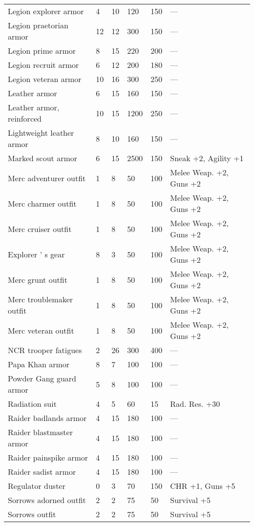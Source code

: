 \documentclass{report}
\begin{document}
\begin{table}[H]
\begin{table}[H]
\begin{table}[H]
\begin{table}[H]
\begin{table}[H]
\begin{table}[H]
\begin{table}[H]
\begin{table}[H]
\begin{table}[H]
\begin{table}[H]
\begin{table}[H]
\begin{table}[H]
\begin{table}[H]
\begin{table}[H]
\begin{table}[H]
\begin{table}[H]
\begin{table}[H]
\begin{table}[H]
\begin{table}[H]
\begin{tabular}{p{30mm}p{30mm}p{30mm}p{30mm}p{30mm}p{30mm}}
Legion explorer armor  & 4 & 10 & 120 & 150 & —  \\
Legion praetorian armor  & 12 & 12 & 300 & 150 & —  \\
Legion prime armor  & 8 & 15 & 220 & 200 & —  \\
Legion recruit armor  & 6 & 12 & 200 & 180 & —  \\
Legion veteran armor  & 10 & 16 & 300 & 250 & —  \\
Leather armor  & 6 & 15 & 160 & 150 & —  \\
Leather armor, reinforced  & 10 & 15 & 1200 & 250 & —  \\
Lightweight leather armor  & 8 & 10 & 160 & 150 & —  \\
Marked scout armor  & 6 & 15 & 2500 & 150 & Sneak +2, Agility +1  \\
Merc adventurer outfit  & 1 & 8 & 50 & 100 & Melee Weap. +2, Guns +2  \\
Merc charmer outfit  & 1 & 8 & 50 & 100 & Melee Weap. +2, Guns +2  \\
Merc cruiser outfit  & 1 & 8 & 50 & 100 & Melee Weap. +2, Guns +2  \\
Explorer ' s gear  & 8 & 3 & 50 & 100 & Melee Weap. +2, Guns +2  \\
Merc grunt outfit  & 1 & 8 & 50 & 100 & Melee Weap. +2, Guns +2  \\
Merc troublemaker outfit  & 1 & 8 & 50 & 100 & Melee Weap. +2, Guns +2  \\
Merc veteran outfit  & 1 & 8 & 50 & 100 & Melee Weap. +2, Guns +2  \\
NCR trooper fatigues  & 2 & 26 & 300 & 400 & —  \\
Papa Khan armor  & 8 & 7 & 100 & 100 & —  \\
Powder Gang guard armor  & 5 & 8 & 100 & 100 & —  \\
Radiation suit  & 4 & 5 & 60 & 15 & Rad. Res. +30  \\
Raider badlands armor  & 4 & 15 & 180 & 100 & —  \\
Raider blastmaster armor  & 4 & 15 & 180 & 100 & —  \\
Raider painspike armor  & 4 & 15 & 180 & 100 & —  \\
Raider sadist armor  & 4 & 15 & 180 & 100 & —  \\
Regulator duster  & 0 & 3 & 70 & 150 & CHR +1, Guns +5  \\
Sorrows adorned outfit  & 2 & 2 & 75 & 50 & Survival +5  \\
Sorrows outfit  & 2 & 2 & 75 & 50 & Survival +5  \\

\end{tabular}
\end{table}
\end{table}
\end{table}
\end{table}
\end{table}
\end{table}
\end{table}
\end{table}
\end{table}
\end{table}
\end{table}
\end{table}
\end{table}
\end{table}
\end{table}
\end{table}
\end{table}
\end{table}
\end{table}
\end{document}
